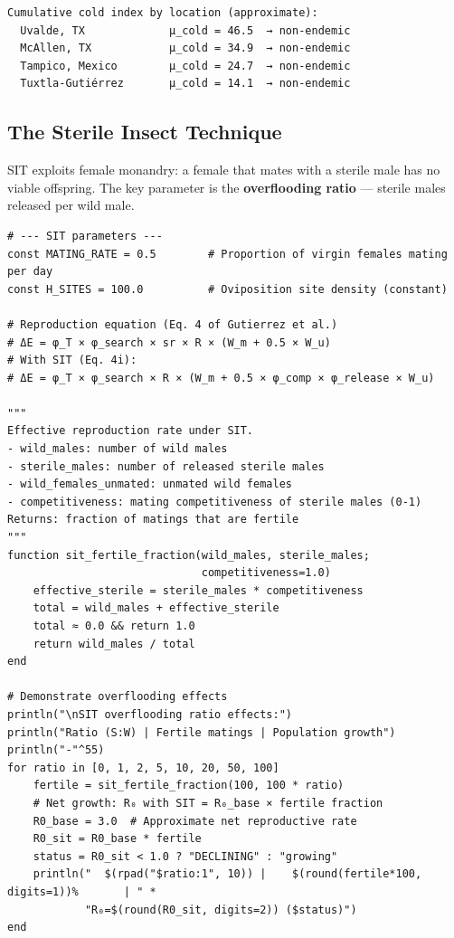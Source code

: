 \begin{verbatim}
Cumulative cold index by location (approximate):
  Uvalde, TX             µ_cold = 46.5  → non-endemic
  McAllen, TX            µ_cold = 34.9  → non-endemic
  Tampico, Mexico        µ_cold = 24.7  → non-endemic
  Tuxtla-Gutiérrez       µ_cold = 14.1  → non-endemic
\end{verbatim}



\subsection{The Sterile Insect Technique}



\label{16357261314629522392}{}


SIT exploits female monandry: a female that mates with a sterile male has no viable offspring. The key parameter is the \textbf{overflooding ratio} — sterile males released per wild male.




\begin{verbatim}
# --- SIT parameters ---
const MATING_RATE = 0.5        # Proportion of virgin females mating per day
const H_SITES = 100.0          # Oviposition site density (constant)

# Reproduction equation (Eq. 4 of Gutierrez et al.)
# ΔE = φ_T × φ_search × sr × R × (W_m + 0.5 × W_u)
# With SIT (Eq. 4i):
# ΔE = φ_T × φ_search × R × (W_m + 0.5 × φ_comp × φ_release × W_u)

"""
Effective reproduction rate under SIT.
- wild_males: number of wild males
- sterile_males: number of released sterile males
- wild_females_unmated: unmated wild females
- competitiveness: mating competitiveness of sterile males (0-1)
Returns: fraction of matings that are fertile
"""
function sit_fertile_fraction(wild_males, sterile_males;
                              competitiveness=1.0)
    effective_sterile = sterile_males * competitiveness
    total = wild_males + effective_sterile
    total ≈ 0.0 && return 1.0
    return wild_males / total
end

# Demonstrate overflooding effects
println("\nSIT overflooding ratio effects:")
println("Ratio (S:W) | Fertile matings | Population growth")
println("-"^55)
for ratio in [0, 1, 2, 5, 10, 20, 50, 100]
    fertile = sit_fertile_fraction(100, 100 * ratio)
    # Net growth: R₀ with SIT = R₀_base × fertile fraction
    R0_base = 3.0  # Approximate net reproductive rate
    R0_sit = R0_base * fertile
    status = R0_sit < 1.0 ? "DECLINING" : "growing"
    println("  $(rpad("$ratio:1", 10)) |    $(round(fertile*100, digits=1))%       | " *
            "R₀=$(round(R0_sit, digits=2)) ($status)")
end
\end{verbatim}




